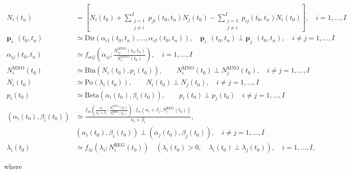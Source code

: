 \documentclass[12pt, a4paper]{article}
\begin{document}
\begin{subequations}
	\begin{align}
	\label{eq:Model2Ini}N_{i}(t_{n}) & = \left[ N_{i}(t_{0}) + \sum_{\substack{j=1\\j\neq i}}^{I}p_{ji}(t_{0}, t_{n})N_{j}(t_{0})-\sum_{\substack{j=1\\j\neq i}}^{I}p_{ij}(t_{0}, t_{n}) N_{i}(t_{0})\right ],\quad i=1,\dots,I\\ 
	\label{eq:Model2Mid}\mathbf{p}_{i\cdot}(t_{0}, t_{n})& \simeq\textrm{Dir}\left(\alpha_{i1}(t_{0}, t_{n}), \dots, \alpha_{iI}(t_{0}, t_{n})\right),\quad \mathbf{p}_{i\cdot}(t_{0}, t_{n})\perp\mathbf{p}_{j\cdot}(t_{0}, t_{n}),\quad i\neq j=1,\dots,I\\
	\label{eq:Model2Fin}\alpha_{ij}(t_{0}, t_{n})&\simeq f_{\alpha ij}\left(\alpha_{ij}; \frac{N_{ij}^{\textrm{MNO}}(t_{0}, t_{n})}{N_{i\cdot}^{\textrm{MNO}}(t_{0})}\right), \quad i=1,\dots,I\\
	\label{eq:Model1Ini}N_{i}^{\textrm{MNO}}(t_{0})&\simeq\textrm{Bin}\left(N_{i}(t_{0}), p_{i}(t_{0})\right),\qquad N_{i}^{\textrm{MNO}}(t_{0})\perp N_{j}^{\textrm{MNO}}(t_{0}),\quad i\neq j=1,\dots,I\\
	N_{i}(t_{0})&\simeq\textrm{Po}\left(\lambda_{i}(t_{0})\right),\qquad N_{i}(t_{0})\perp N_{j}(t_{0}),\quad i\neq j=1,\dots,I\\
	p_{i}(t_{0})&\simeq\textrm{Beta}\left(\alpha_{i}(t_{0}),\beta_{i}(t_{0})\right),\qquad p_{i}(t_{0})\perp p_{j}(t_{0})\quad i\neq j=1,\dots,I\\
	\left(\alpha_{i}(t_{0}), \beta_{i}(t_{0})\right)&\simeq \frac{f_{ui}\left(\frac{\alpha_{i}}{\alpha_{i}+\beta_{i}}; \frac{N_{i}^{\textrm{MNO}}(t_{0})}{N_{i}^{\textrm{REG}}(t_{0})}\right)\cdot f_{vi}\left(\alpha_{i}+\beta_{i}; N_{i}^{\textrm{REG}}(t_{0})\right)}{\alpha_{i}+\beta_{i}},\nonumber \\ &(\alpha_{i}(t_{0}),\beta_{i}(t_{0}))\perp(\alpha_{j}(t_{0}),\beta_{j}(t_{0})),\quad i\neq j=1,\dots,I\\
	\label{eq:Model1Fin}\lambda_{i}(t_{0})&\simeq f_{\lambda i}(\lambda_{i}; N_{i}^{\textrm{REG}}(t_{0}))\quad (\lambda_{i}(t_{0}) > 0,\quad \lambda_{i}(t_{0})\perp\lambda_{j}(t_{0})), \quad i=1,\dots,I,
	\end{align}
\end{subequations}

\noindent where 
\end{document}
